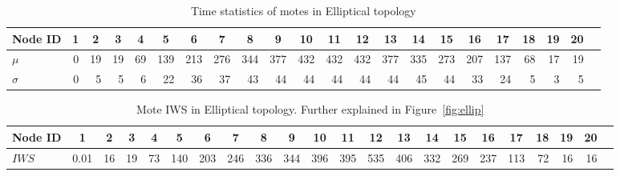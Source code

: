 \documentclass[conference,manuscript]{IEEEtran}
\newcommand*{\bd}[1]{\multicolumn{1}{|c}{\bfseries #1}}
\begin{document}
\begin{table}[t!]
\centering
\begin{tabular}{|l|*{20}{r|}r}
\hline
\bd{Node ID}           & \bd{1} & \bd{2} & \bd{3} & \bd{4} & \bd{5} & \bd{6} & \bd{7} & \bd{8} & \bd{9} & \bd{10} & \bd{11} & \bd{12} & \bd{13} & \bd{14} & \bd{15} & \bd{16} & \bd{17} & \bd{18} & \bd{19} & \bd{20} \\
\hline
$\mu$            & 0 &19 & 19& 69&139 &213&276&344&377&432 &432 &432 &377 &335 &273 & 207&137 & 68 & 17 & 19 \\
$\sigma$		 & 0 & 5 & 5 & 6 & 22 & 36& 37&43 &44 & 44 & 44 & 44 & 44 & 45 & 44  & 33 & 24 & 5 & 3 & 5 \\
\hline
\end{tabular}
\caption{Time statistics of motes in Elliptical topology}
\label{tab:stat_ellip}
\end{table}

\begin{table}[t!]
\centering
\begin{tabular}{|l|*{20}{r|}r}
\hline
\bd{Node ID}           & \bd{1} & \bd{2} & \bd{3} & \bd{4} & \bd{5} & \bd{6} & \bd{7} & \bd{8} & \bd{9} & \bd{10} & \bd{11} & \bd{12} & \bd{13} & \bd{14} & \bd{15} & \bd{16} & \bd{17} & \bd{18} & \bd{19} & \bd{20} \\
\hline
$\mathit{IWS}$
                 &0.01&16 &19 &73 & 140 &203 &246 &336 &344 &396 &395 &535 &406 &332 &269 &237 &113 & 72& 16 & 16 \\
\hline
\end{tabular}
\caption{Mote IWS in Elliptical topology. Further explained in Figure~\ref{fig:ellip}}
\label{tab:iws_ellip}
\end{table}
\end{document}
